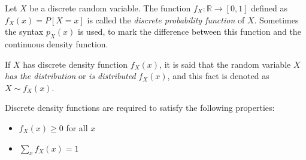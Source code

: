 \documentclass{article}
\begin{document}

Let $X$ be a discrete random variable. The function $f_X\colon\mathbb{R} \to [0,1]$ defined as  $f_X(x)=P[X=x]$ is called the {\it discrete probability function} of $X$. Sometimes the syntax $p_X(x)$ is used, to mark the difference between this function and the continuous density function.

If $X$ has discrete density function $f_X(x)$, it is said that the random variable $X$ {\it has the distribution} or {\it is distributed} $f_X(x)$, and this fact is denoted as $X \sim f_X(x)$.

Discrete density functions are required to satisfy the following properties:
\begin{itemize}
\item $f_X(x) \geq 0$ for all $x$
\item $\sum_{x}f_X(x) = 1$
\end{itemize}
\end{document}
